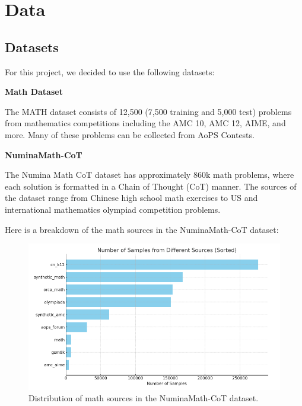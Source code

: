 \documentclass{article}
\begin{document}
\section{Data}


\subsection{Datasets}

For this project, we decided to use the following datasets:

{\bf Math Dataset}

The MATH dataset \cite{hendrycksmath2021} consists of 12,500 (7,500 training and 5,000 test) problems from mathematics competitions including the AMC 10, AMC 12, AIME, and more. Many of these problems can be collected from AoPS Contests. \cite{aops_contests}

{\bf NuminaMath-CoT}

The Numina Math CoT dataset has approximately 860k math problems, where each solution is formatted in a Chain of Thought (CoT) manner. The sources of the dataset range from Chinese high school math exercises to US and international mathematics olympiad competition problems.
\cite{numina_math_datasets_CoT}

Here is a breakdown of the math sources in the NuminaMath-CoT dataset:

\begin{figure}[H]
  \centering
  \includegraphics[scale=0.6]{./figures/math_sources.png}
  \caption{Distribution of math sources in the NuminaMath-CoT dataset.}
  \label{fig:math-sources}
\end{figure}
\end{document}

